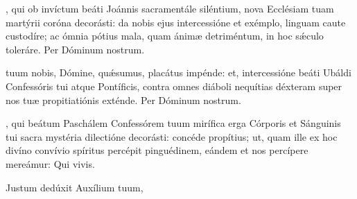 \documentclass[fontsize=9pt,paper=A6,twoside,BCOR=1mm,DIV=22,headinclude]{scrarticle}
\begin{document}
\begin{multicols}{2}
\Te 


\VRMTPii 

\BMTP 

, qui ob invíctum beáti Joánnis sacramentále siléntium, nova Ecclésiam tuam martýrii coróna decorásti: da nobis ejus intercessióne et exémplo, linguam caute custodíre; ac ómnia pótius mala, quam ánimæ detriméntum, in hoc s\'æculo toleráre. Per Dóminum nostrum.


\AiiCPA 

\VRCPiiA

 tuum nobis, Dómine, quǽsumus, placátus impénde: et, intercessióne beáti Ubáldi Confessóris tui atque Pontíficis, contra omnes diáboli nequítias déxteram super nos tuæ propitiatiónis exténde. Per Dóminum nostrum.


\VRMTPiii 

\MiiMTP 

\columnbreak
{}

\AiCA 

\VRiCA 

, qui beátum Paschálem Confessórem tuum mirífica erga Córporis et Sánguinis tui sacra mystéria dilectióne decorásti: concéde propítius; ut, quam ille ex hoc divíno convívio spíritus percépit pinguédinem, eándem et nos percípere mereámur: Qui vivis.


\AiiiCPA 

\V Justum dedúxit  Auxílium tuum, 








\end{multicols}

\ornamentvi
\end{document}
